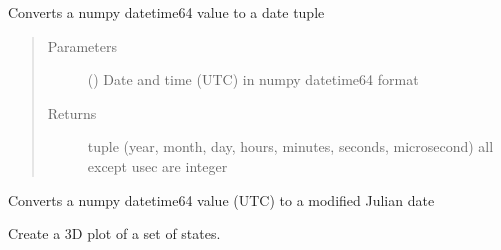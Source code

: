 \documentclass[letterpaper,10pt,english]{sphinxmanual}
\begin{document}
\begin{fulllineitems}
\label{\detokenize{modules/dpt_tools:dpt_tools.npdt2date}}
Converts a numpy datetime64 value to a date tuple
\begin{quote}\begin{description}
\item[{Parameters}] \leavevmode
{} () \textendash{} Date and time (UTC) in numpy datetime64 format

\item[{Returns}] \leavevmode
tuple (year, month, day, hours, minutes, seconds, microsecond)
all except usec are integer

\end{description}\end{quote}

\end{fulllineitems}


\begin{fulllineitems}
\label{\detokenize{modules/dpt_tools:dpt_tools.npdt2mjd}}
Converts a numpy datetime64 value (UTC) to a modified Julian date

\end{fulllineitems}


\begin{fulllineitems}
\label{\detokenize{modules/dpt_tools:dpt_tools.orbit3D}}
Create a 3D plot of a set of states.

\end{fulllineitems}

\end{document}
